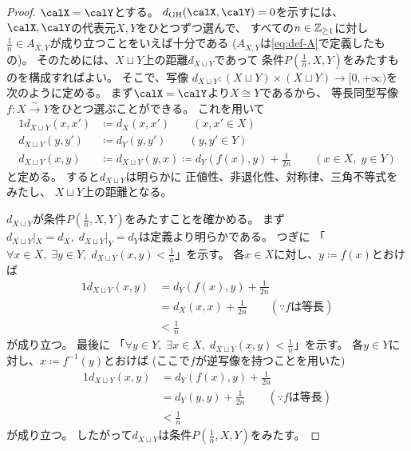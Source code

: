 \documentclass[report, notitlepage]{jlreq}
\newcommand{\GH}{\mathrm{GH}}
\begin{document}
\begin{proof}
    $\calX = \calY$とする。
    $d_\GH(\calX, \calY) = 0$を示すには、
    $\calX, \calY$の代表元$X, Y$をひとつずつ選んで、
    すべての$n \in \mathbb{Z}_{\ge 1}$に対し
    $\tfrac{1}{n} \in A_{X, Y}$が成り立つことをいえば十分である
    ($A_{X, Y}$は\cref{eq:def-A}で定義したもの)。
    そのためには、$X \sqcup Y$上の距離$d_{X \sqcup Y}$であって
    条件$P(\tfrac{1}{n}, X, Y)$をみたすものを構成すればよい。
    そこで、写像
    $d_{X \sqcup Y} \colon (X \sqcup Y) \times (X \sqcup Y) \to [0, +\infty)$を
    次のように定める。
    まず$\calX = \calY$より$X \cong Y$であるから、
    等長同型写像$f \colon X \stackrel{\sim}{\to} Y$をひとつ選ぶことができる。
    これを用いて
    \begin{alignat}{1}
        d_{X \sqcup Y}(x, x')
            &\coloneqq
                d_X(x, x')
                \qquad
                (x, x' \in X)
                \\
        d_{X \sqcup Y}(y, y')
            &\coloneqq
                d_Y(y, y')
                \qquad
                (y, y' \in Y)
                \\
        d_{X \sqcup Y}(x, y)
            &\coloneqq
                d_{X \sqcup Y}(y, x)
            \coloneqq
                d_Y(f(x), y)
                + \frac{1}{2n}
                \qquad
                (x \in X, \; y \in Y)
    \end{alignat}
    と定める。
    すると$d_{X \sqcup Y}$は明らかに
    正値性、非退化性、対称律、三角不等式をみたし、
    $X \sqcup Y$上の距離となる。

    $d_{X \sqcup Y}$が条件$P(\tfrac{1}{n}, X, Y)$をみたすことを確かめる。
    まず$d_{X \sqcup Y}|_X = d_X, \; d_{X \sqcup Y}|_Y = d_Y$は定義より明らかである。
    つぎに
    「$\forall x \in X, \;
        \exists y \in Y, \;
        d_{X \sqcup Y}(x, y) < \tfrac{1}{n}$」を示す。
    各$x \in X$に対し、$y \coloneqq f(x)$とおけば
    \begin{alignat}{1}
        d_{X \sqcup Y}(x, y)
            &=
                d_Y(f(x), y)
                + \frac{1}{2n}
                \\
            &=
                d_X(x, x)
                + \frac{1}{2n}
                \qquad
                (\because \text{$f$は等長})
                \\
            &<
                \frac{1}{n}
    \end{alignat}
    が成り立つ。
    最後に
    「$\forall y \in Y, \;
        \exists x \in X, \;
        d_{X \sqcup Y}(x, y) < \tfrac{1}{n}$」を示す。
    各$y \in Y$に対し、$x \coloneqq f^{-1}(y)$とおけば
    (ここで$f$が逆写像を持つことを用いた)
    \begin{alignat}{1}
        d_{X \sqcup Y}(x, y)
            &=
                d_Y(f(x), y)
                + \frac{1}{2n}
                \\
            &=
                d_Y(y, y)
                + \frac{1}{2n}
                \qquad
                (\because \text{$f$は等長})
                \\
            &<
                \frac{1}{n}
    \end{alignat}
    が成り立つ。
    したがって$d_{X \sqcup Y}$は条件$P(\tfrac{1}{n}, X, Y)$をみたす。


\end{proof}
\end{document}
